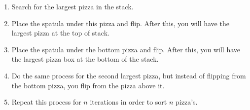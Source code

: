 \documentclass[11pt]{article}
\begin{document}
\begin{enumerate}
			\begin{enumerate}
				\item Search for the largest pizza in the stack. 
				\item Place the spatula under this pizza and flip. After this, you will have the largest pizza at the top of stack. 
				\item Place the spatula under the bottom pizza and flip. After this, you will have the largest pizza box at the bottom of the stack. 
				\item Do the same process for the second largest pizza, but instead of flipping from the bottom pizza, you flip from the pizza above it. 
				\item Repeat this process for $n$ iterations in order to sort $n$ pizza's. 
			\end{enumerate} 

		
	\end{enumerate}
	
\end{document}
